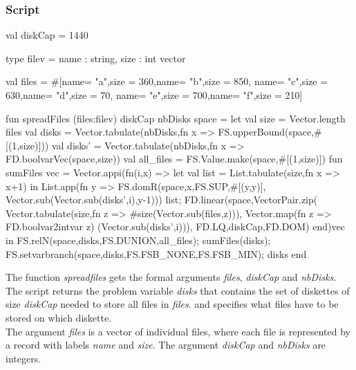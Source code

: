 \documentclass[a4paper]{scrartcl}
\begin{document}
\subsubsection{Script}
\begin{myverbatim}
val diskCap = 1440

type filev = {name : string, size : int} vector

val files = #[{name= "a",size = 360},{name= "b",size = 850},
              {name= "c",size = 630},{name= "d",size = 70},
              {name= "e",size = 700},{name= "f",size = 210}]
    

fun spreadFiles (files:filev) diskCap nbDisks space =
    let
       val size = Vector.length files
       val disks = Vector.tabulate(nbDisks,fn x => 
                      FS.upperBound(space,#[(1,size)]))
       val disks' = Vector.tabulate(nbDisks,fn x => 
                      FD.boolvarVec(space,size))
       val all_files = FS.Value.make(space,#[(1,size)])          
       fun sumFiles vec =  
           Vector.appi(fn(i,x) => 
             let 
                val list = List.tabulate(size,fn x => x+1)
             in      
                List.app(fn y => FS.domR(space,x,FS.SUP,#[(y,y)],
                           Vector.sub(Vector.sub(disks',i),y-1)))
                        list;
                FD.linear(space,VectorPair.zip(
                           Vector.tabulate(size,fn z => 
                                      #size(Vector.sub(files,z))),
                            Vector.map(fn z => FD.boolvar2intvar z)
                                 (Vector.sub(disks',i))),
                          FD.LQ,diskCap,FD.DOM)
             end)vec
   in 
       FS.relN(space,disks,FS.DUNION,all_files);
       sumFiles(disks);
       FS.setvarbranch(space,disks,FS.FSB_NONE,FS.FSB_MIN); 
       disks
   end
     
     
\end{myverbatim}


The function {\it spreadfiles} gets the formal arguments {\it files},
{\it diskCap} and {\it nbDisks}. The script returns the problem 
variable {\it disks} that contains the set of diskettes of 
size {\it diskCap} needed to store all files in {\it files}. 
and specifies what files have to be stored on which diskette.\\ 

The argument {\it files} is a vector of individual files, where each 
file is represented by a record with labels {\it name} and {\it size}. 
The argument {\it diskCap} and {\it nbDisks} are integers.\\ 
\end{document}
